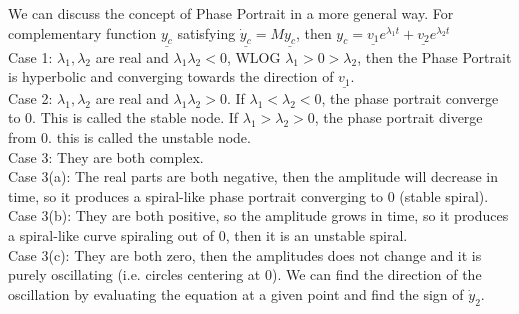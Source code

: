 We can discuss the concept of Phase Portrait in a more general way.
For complementary function $\underline{y_c}$ satisfying $\underline{\dot{y}_c}=M\underline{y_c}$, then $y_c=\underline{v_1}e^{\lambda_1 t}+\underline{v_2}e^{\lambda_2 t}$\\
Case 1: $\lambda_1,\lambda_2$ are real and $\lambda_1\lambda_2<0$, WLOG $\lambda_1>0>\lambda_2$, then the Phase Portrait is hyperbolic and converging towards the direction of $\underline{v_1}$.\\
Case 2: $\lambda_1,\lambda_2$ are real and $\lambda_1\lambda_2>0$.
If $\lambda_1<\lambda_2<0$, the phase portrait converge to $0$.
This is called the stable node.
If $\lambda_1>\lambda_2>0$, the phase portrait diverge from $0$.
this is called the unstable node.\\
Case 3: They are both complex.\\
Case 3(a): The real parts are both negative, then the amplitude will decrease in time, so it produces a spiral-like phase portrait converging to $0$ (stable spiral).\\
Case 3(b): They are both positive, so the amplitude grows in time, so it produces a spiral-like curve spiraling out of $0$, then it is an unstable spiral.\\
Case 3(c): They are both zero, then the amplitudes does not change and it is purely oscillating (i.e. circles centering at $0$).
We can find the direction of the oscillation by evaluating the equation at a given point and find the sign of $\dot{y}_2$.
